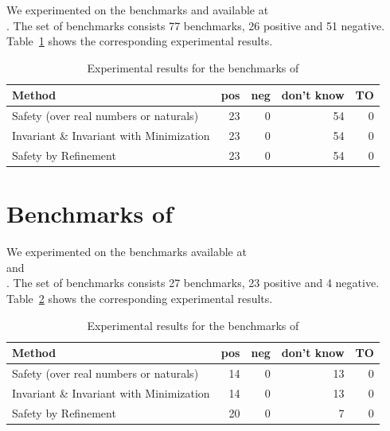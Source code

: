 \documentclass{llncs}
\begin{document}
We experimented on the benchmarks  and
 available at \\
.
The set of benchmarks consists 77 benchmarks, 26 positive and 51 negative.
Table~\ref{bfc-experiments} shows the corresponding experimental results.

\begin{table}[h]
\begin{center}
  \begin{tabular}{ | p{7cm} | r | r | r | r | } %
    \hline
    Method & pos & neg & don't know & TO \\
    \hline
    Safety (over real numbers or naturals)      & 23 &  0 & 54 &  0 \\
    Invariant \& Invariant with Minimization    & 23 &  0 & 54 &  0 \\
    Safety by Refinement                        & 23 &  0 & 54 &  0 \\
    \hline
  \end{tabular}
\end{center}
\caption{Experimental results for the benchmarks of \bfc}
\label{bfc-experiments}
\end{table}

\section{Benchmarks of \mist}

We experimented on the benchmarks available at \\
and \\
.
The set of benchmarks consists 27 benchmarks, 23 positive and 4 negative.
Table~\ref{mist-experiments} shows the corresponding experimental results.

\begin{table}[h]
\begin{center}
  \begin{tabular}{ | p{6cm} | r | r | r | r | }
    \hline
    Method & pos & neg & don't know & TO \\
    \hline
    Safety (over real numbers or naturals)      & 14 &  0 & 13 &  0 \\
    Invariant \& Invariant with Minimization    & 14 &  0 & 13 &  0 \\
    Safety by Refinement                        & 20 &  0 &  7 &  0 \\
    \hline
  \end{tabular}
\end{center}
\caption{Experimental results for the benchmarks of \mist}
\label{mist-experiments}
\end{table}
\end{document}
